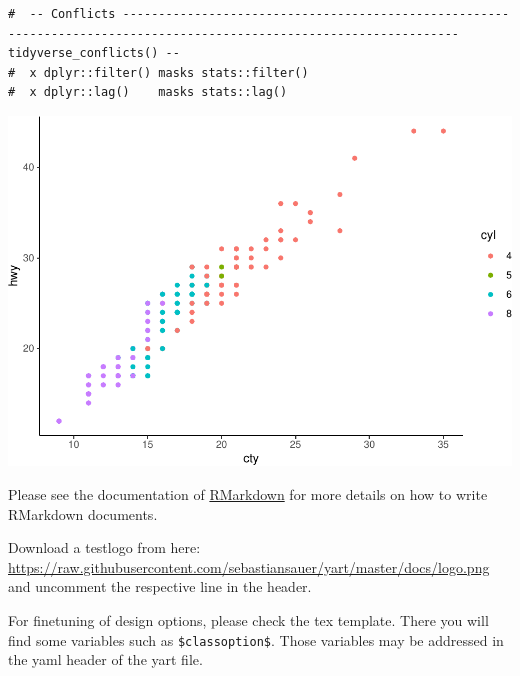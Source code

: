 \documentclass[11pt,a4paper,oneside]{article}
\newenvironment{Shaded}{\begin{snugshade}}{\end{snugshade}}
\newcommand{\DataTypeTok}[1]{\textcolor[rgb]{0.13,0.29,0.53}{#1}}
\newcommand{\KeywordTok}[1]{\textcolor[rgb]{0.13,0.29,0.53}{\textbf{#1}}}
\newcommand{\NormalTok}[1]{#1}
\newcommand{\OperatorTok}[1]{\textcolor[rgb]{0.81,0.36,0.00}{\textbf{#1}}}
\newcommand{\StringTok}[1]{\textcolor[rgb]{0.31,0.60,0.02}{#1}}
\begin{document}
\begin{verbatim}
#  -- Conflicts --------------------------------------------------------------------------------------------------------------------- tidyverse_conflicts() --
#  x dplyr::filter() masks stats::filter()
#  x dplyr::lag()    masks stats::lag()
\end{verbatim}

\begin{Shaded}
\end{Shaded}

\includegraphics{LatexTest_files/figure-latex/unnamed-chunk-1-1.pdf}

Please see the documentation of
\href{http://rmarkdown.rstudio.com/}{RMarkdown} for more details on how
to write RMarkdown documents.

Download a testlogo from here:
\url{https://raw.githubusercontent.com/sebastiansauer/yart/master/docs/logo.png}
and uncomment the respective line in the header.

For finetuning of design options, please check the tex template. There
you will find some variables such as \texttt{\$classoption\$}. Those
variables may be addressed in the yaml header of the yart file.
\end{document}
